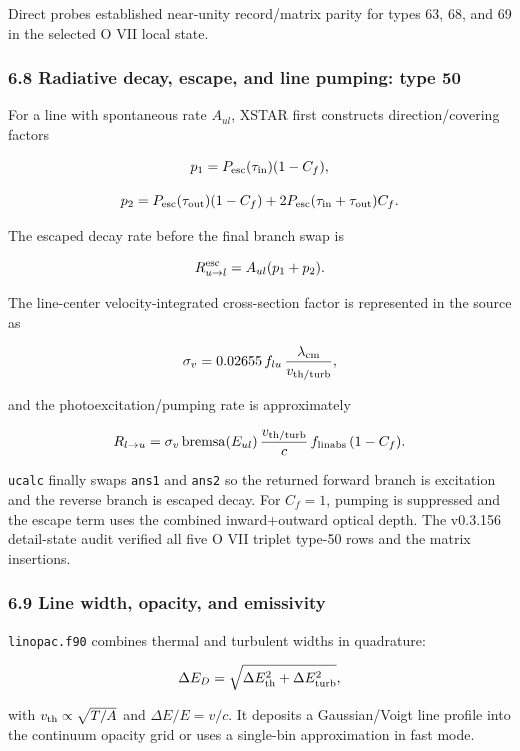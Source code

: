 \documentclass[
  10pt,
]{article}
\newcommand{\passthrough}[1]{#1}
\begin{document}
Direct probes established near-unity record/matrix parity for types 63,
68, and 69 in the selected O VII local state.

\subsubsection{6.8 Radiative decay, escape, and line pumping: type
50}\label{radiative-decay-escape-and-line-pumping-type-50}

For a line with spontaneous rate \(A_{{ul}}\), XSTAR first constructs
direction/covering factors

\[
p_1=P_{{\rm esc}}(\tau_{{\rm in}})(1-C_f),
\]

\[
p_2=P_{{\rm esc}}(\tau_{{\rm out}})(1-C_f)
 +2P_{{\rm esc}}(\tau_{{\rm in}}+\tau_{{\rm out}})C_f.
\]

The escaped decay rate before the final branch swap is

\[
R_{{u\rightarrow l}}^{{\rm esc}}=A_{{ul}}(p_1+p_2).
\]

The line-center velocity-integrated cross-section factor is represented
in the source as

\[
\sigma_v = 0.02655\,f_{{lu}}\,\frac{{\lambda_{{\rm cm}}}}{{v_{{\rm th/turb}}}},
\]

and the photoexcitation/pumping rate is approximately

\[
R_{{l\rightarrow u}} = \sigma_v\,
\mathrm{{bremsa}}(E_{{ul}})\,\frac{{v_{{\rm th/turb}}}}{{c}}
\,f_{{\rm linabs}}\,(1-C_f).
\]

\passthrough{\lstinline!ucalc!} finally swaps
\passthrough{\lstinline!ans1!} and \passthrough{\lstinline!ans2!} so the
returned forward branch is excitation and the reverse branch is escaped
decay. For \(C_f=1\), pumping is suppressed and the escape term uses the
combined inward+outward optical depth. The v0.3.156 detail-state audit
verified all five O VII triplet type-50 rows and the matrix insertions.

\subsubsection{6.9 Line width, opacity, and
emissivity}\label{line-width-opacity-and-emissivity}

\passthrough{\lstinline!linopac.f90!} combines thermal and turbulent
widths in quadrature:

\[
\Delta E_D = \sqrt{{\Delta E_{{\rm th}}^2+\Delta E_{{\rm turb}}^2}},
\]

with \(v_{{\rm th}}\propto\sqrt{{T/A}}\) and \(\Delta E/E=v/c\). It
deposits a Gaussian/Voigt line profile into the continuum opacity grid
or uses a single-bin approximation in fast mode.
\end{document}
